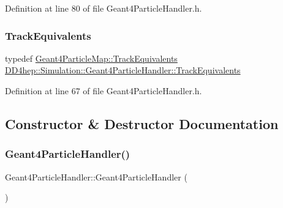 Definition at line 80 of file Geant4\+Particle\+Handler.\+h.

\hypertarget{class_d_d4hep_1_1_simulation_1_1_geant4_particle_handler_a6163ec58bca837bb4544fd6e2f4bc05a}{}\label{class_d_d4hep_1_1_simulation_1_1_geant4_particle_handler_a6163ec58bca837bb4544fd6e2f4bc05a} 
\subsubsection{\texorpdfstring{Track\+Equivalents}{TrackEquivalents}}
{\footnotesize\ttfamily typedef \hyperlink{class_d_d4hep_1_1_simulation_1_1_geant4_particle_map_aba09f5fcb2dd5874d129660ad4454a21}{Geant4\+Particle\+Map\+::\+Track\+Equivalents} \hyperlink{class_d_d4hep_1_1_simulation_1_1_geant4_particle_handler_a6163ec58bca837bb4544fd6e2f4bc05a}{D\+D4hep\+::\+Simulation\+::\+Geant4\+Particle\+Handler\+::\+Track\+Equivalents}}



Definition at line 67 of file Geant4\+Particle\+Handler.\+h.



\subsection{Constructor \& Destructor Documentation}
\hypertarget{class_d_d4hep_1_1_simulation_1_1_geant4_particle_handler_a0de98b6650d1787bf26b6b959bc7e502}{}\label{class_d_d4hep_1_1_simulation_1_1_geant4_particle_handler_a0de98b6650d1787bf26b6b959bc7e502} 
\subsubsection{\texorpdfstring{Geant4\+Particle\+Handler()}{Geant4ParticleHandler()}\hspace{0.1cm}{\footnotesize\ttfamily [1/2]}}
{\footnotesize\ttfamily Geant4\+Particle\+Handler\+::\+Geant4\+Particle\+Handler (\begin{DoxyParamCaption}{ }\end{DoxyParamCaption})\hspace{0.3cm}{\ttfamily [private]}}



